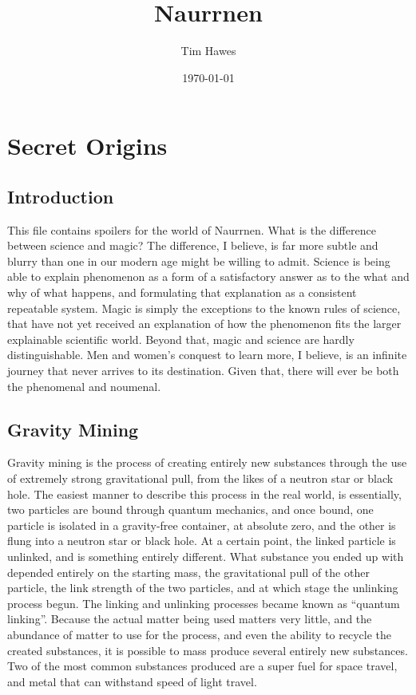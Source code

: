\documentclass[11pt]{article}
\author{Tim Hawes}
\date{\today}
\title{Naurrnen}
\begin{document}
\maketitle
\tableofcontents

\section{Secret Origins}
\label{sec:orgf664b94}
\subsection{Introduction}
\label{sec:org326a72f}
This file contains spoilers for the world of Naurrnen. What is the difference between science and magic? The difference, I believe, is far more subtle and blurry than one in our modern age might be willing to admit. Science is being able to explain phenomenon as a form of a satisfactory answer as to the what and why of what happens, and formulating that explanation as a consistent repeatable system. Magic is simply the exceptions to the known rules of science, that have not yet received an explanation of how the phenomenon fits the larger explainable scientific world. Beyond that, magic and science are hardly distinguishable. Men and women's conquest to learn more, I believe, is an infinite journey that never arrives to its destination. Given that, there will ever be both the phenomenal and noumenal.

\subsection{Gravity Mining}
\label{sec:org689587c}
Gravity mining is the process of creating entirely new substances through the use of extremely strong gravitational pull, from the likes of a neutron star or black hole. The easiest manner to describe this process in the real world, is essentially, two particles are bound through quantum mechanics, and once bound, one particle is isolated in a gravity-free container, at absolute zero, and the other is flung into a neutron star or black hole. At a certain point, the linked particle is unlinked, and is something entirely different. What substance you ended up with depended entirely on the starting mass, the gravitational pull of the other particle, the link strength of the two particles, and at which stage the unlinking process begun. The linking and unlinking processes became known as ``quantum linking''. Because the actual matter being used matters very little, and the abundance of matter to use for the process, and even the ability to recycle the created substances, it is possible to mass produce several entirely new substances. Two of the most common substances produced are a super fuel for space travel, and metal that can withstand speed of light travel.
\end{document}
